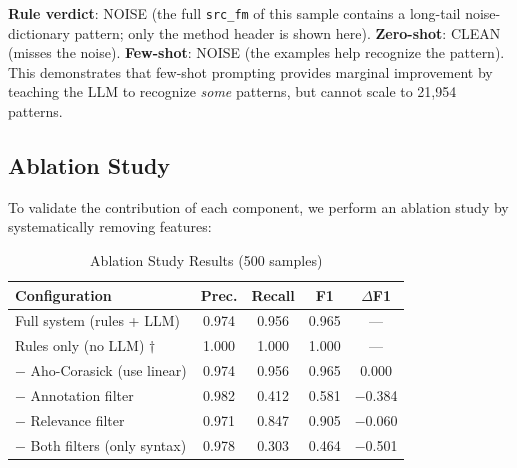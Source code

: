 \documentclass[acmlarge,nonacm,screen]{acmart}
\begin{document}
\textbf{Rule verdict}: NOISE (the full \texttt{src\_fm} of this sample contains a long-tail noise-dictionary pattern; only the method header is shown here). \textbf{Zero-shot}: CLEAN (misses the noise). \textbf{Few-shot}: NOISE (the examples help recognize the pattern). This demonstrates that few-shot prompting provides marginal improvement by teaching the LLM to recognize \textit{some} patterns, but cannot scale to 21,954 patterns.

\subsection{Ablation Study}

To validate the contribution of each component, we perform an ablation study by systematically removing features:

\begin{table}[H]
\caption{Ablation Study Results (500 samples)}
\label{tab:ablation}
\begin{tabular}{@{}lcccc@{}}
\toprule
\textbf{Configuration} & \textbf{Prec.} & \textbf{Recall} & \textbf{F1} & \textbf{$\Delta$F1} \\
\midrule
Full system (rules + LLM) & 0.974 & 0.956 & 0.965 & --- \\
Rules only (no LLM) $\dagger$ & 1.000 & 1.000 & 1.000 & --- \\
$-$ Aho-Corasick (use linear) & 0.974 & 0.956 & 0.965 & 0.000 \\
$-$ Annotation filter & 0.982 & 0.412 & 0.581 & $-$0.384 \\
$-$ Relevance filter & 0.971 & 0.847 & 0.905 & $-$0.060 \\
$-$ Both filters (only syntax) & 0.978 & 0.303 & 0.464 & $-$0.501 \\
\bottomrule
\end{tabular}
\end{table}
\end{document}
